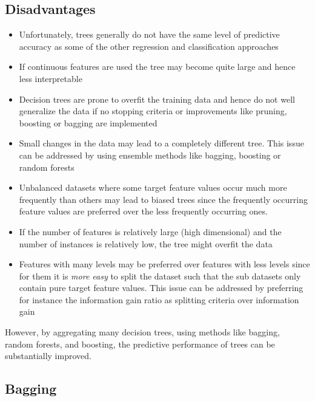 \documentclass[%
oneside,                 %
final,                   %
10pt]{article}
\begin{document}
\noindent
\subsection{Disadvantages}

\begin{itemize}
\item Unfortunately, trees generally do not have the same level of predictive accuracy as some of the other regression and classification approaches

\item If continuous features are used the tree may become quite large and hence less interpretable

\item Decision trees are prone to overfit the training data and hence do not well generalize the data if no stopping criteria or improvements like pruning, boosting or bagging are implemented

\item Small changes in the data may lead to a completely different tree. This issue can be addressed by using ensemble methods like bagging, boosting or random forests

\item Unbalanced datasets where some target feature values occur much more frequently than others may lead to biased trees since the frequently occurring feature values are preferred over the less frequently occurring ones. 

\item If the number of features is relatively large (high dimensional) and the number of instances is relatively low, the tree might overfit the data

\item Features with many levels may be preferred over features with less levels since for them it is \emph{more easy} to split the dataset such that the sub datasets only contain pure target feature values. This issue can be addressed by preferring for instance the information gain ratio as splitting criteria over information gain
\end{itemize}

\noindent
However, by aggregating many decision trees, using methods like bagging, random forests, and boosting, the predictive performance of trees can be substantially improved. 

\subsection{Bagging}
\end{document}
